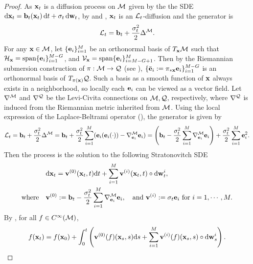 \begin{proof}
    As $\mathbf{x}_t$ is a diffusion process on $\mathcal{M}$ given by the the SDE $\mathrm{d} \mathbf{x}_t = \mathbf{b}_t(\mathbf{x}_t) \,\mathrm{d} t + \sigma_t \,\mathrm{d} \mathbf{w}_t$, by  and , $\mathbf{x}_t$ is an $\mathcal{L}_t$-diffusion and the generator is
    \begin{align}
        \mathcal{L}_t=\mathbf{b}_t + \frac{\sigma_t^2}{2} \Delta^{\mathcal{M}}.
    \end{align}
    For any $\mathbf{x} \in \mathcal{M}$, let $\{\mathbf{e}_i\}_{i=1}^M$ be an orthonormal basis of $T_{\mathbf{x}} \mathcal{M}$ such that $\mathcal{H}_{\mathbf{x}} = \mathrm{span}\{\mathbf{e}_i\}_{i=1}^{M-G}$, and $\mathcal{V}_{\mathbf{x}} = \mathrm{span}\{\mathbf{e}_i\}_{i=M-G+1}^M$. Then by the Riemannian submersion construction of $\pi:\mathcal{M}\to\mathcal{Q}$ (see ), $\{\bar{\mathbf{e}}_i:=\pi_{*\mathbf{x}} \mathbf{e}_i\}_{i=1}^{M-G}$ is an orthonormal basis of $T_{\pi(\mathbf{x})} \mathcal{Q}$. Such a basis as a smooth function of $\mathbf{x}$ always exists in a neighborhood, so locally each $\mathbf{e}_i$ can be viewed as a vector field.
    Let $\nabla^{\mathcal{M}}$ and $\nabla^{\mathcal{Q}}$ be the Levi-Civita connections on $\mathcal{M},\mathcal{Q}$, respectively, where $\nabla^{\mathcal{Q}}$ is induced from the Riemannian metric inherited from $\mathcal{M}$. %
    Using the local expression of the Laplace-Beltrami operator (), the generator is given by
    \begin{align}
        \mathcal{L}_t =\mathbf{b}_t + \frac{\sigma_t^2}{2} \Delta^{\mathcal{M}} =\mathbf{b}_t + \frac{\sigma_t^2}{2}\sum_{i=1}^{M}(\mathbf{e}_i(\mathbf{e}_i(\cdot))-\nabla^{\mathcal{M}}_{\mathbf{e}_i}\mathbf{e}_i)
        =\left(\mathbf{b}_t - \frac{\sigma_t^2}{2}\sum_{i=1}^{M}\nabla^{\mathcal{M}}_{\mathbf{e}_i}\mathbf{e}_i\right) +\frac{\sigma_t^2}{2}\sum_{i=1}^M \mathbf{e}_i^2.
    \end{align}
    Then the process is the solution to the following Stratonovitch SDE
    \begin{align}
        & \mathrm{d}\mathbf{x}_t=\mathbf{v}^{(0)}(\mathbf{x}_t,t)\mathrm{d} t+\sum_{i=1}^{M} \mathbf{v}^{(i)}(\mathbf{x}_t,t)\circ\mathrm{d} \mathbf{w}_t^i, \\
        \text{where}\quad & \mathbf{v}^{(0)}:=\mathbf{b}_t - \frac{\sigma_t^2}{2}\sum_{i=1}^{M}\nabla^{\mathcal{M}}_{\mathbf{e}_i}\mathbf{e}_i, \quad
        \text{and } \mathbf{v}^{(i)}:=\sigma_t \mathbf{e}_i \text{ for } i=1,\cdots,M.
    \end{align}
    By , for all $f\in C^\infty(\mathcal{M})$,
    \begin{align}
        f(\bfxx_t)=f(\bfxx_0)+\int_0^t\left(\bfvv^{(0)}(f)(\bfxx_s,s)\dd s+\sum_{i=1}^M\bfvv^{(i)}(f)(\bfxx_s,s)\circ\dd \bfww_s^i\right).

\end{align}
\end{proof}
